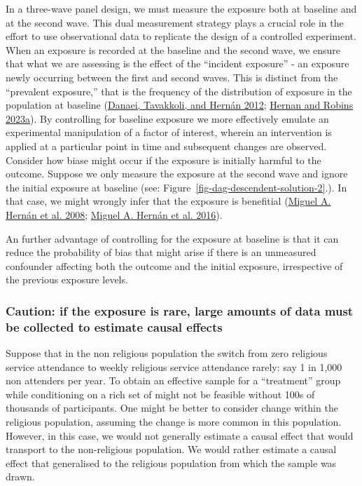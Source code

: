 \documentclass[
  singlecolumn]{report}
\begin{document}
In a three-wave panel design, we must measure the exposure both at
baseline and at the second wave. This dual measurement strategy plays a
crucial role in the effort to use observational data to replicate the
design of a controlled experiment. When an exposure is recorded at the
baseline and the second wave, we ensure that what we are assessing is
the effect of the ``incident exposure'' - an exposure newly occurring
between the first and second waves. This is distinct from the
``prevalent exposure,'' that is the frequency of the distribution of
exposure in the population at baseline
(\protect\hyperlink{ref-danaei2012}{Danaei, Tavakkoli, and Hernán 2012};
\protect\hyperlink{ref-hernan2023}{Hernan and Robins 2023a}). By
controlling for baseline exposure we more effectively emulate an
experimental manipulation of a factor of interest, wherein an
intervention is applied at a particular point in time and subsequent
changes are observed. Consider how biase might occur if the exposure is
initially harmful to the outcome. Suppose we only measure the exposure
at the second wave and ignore the initial exposure at baseline (see:
Figure~\ref{fig-dag-descendent-solution-2}.). In that case, we might
wrongly infer that the exposure is benefitial
(\protect\hyperlink{ref-hernuxe1n2008a}{Miguel A. Hernán et al. 2008};
\protect\hyperlink{ref-hernuxe1n2016a}{Miguel A. Hernán et al. 2016}).

An further advantage of controlling for the exposure at baseline is that
it can reduce the probability of bias that might arise if there is an
unmeasured confounder affecting both the outcome and the initial
exposure, irrespective of the previous exposure levels.

\hypertarget{caution-if-the-exposure-is-rare-large-amounts-of-data-must-be-collected-to-estimate-causal-effects}{%
\subsubsection{\texorpdfstring{\textbf{Caution: if the exposure is rare,
large amounts of data must be collected to estimate causal
effects}}{Caution: if the exposure is rare, large amounts of data must be collected to estimate causal effects}}\label{caution-if-the-exposure-is-rare-large-amounts-of-data-must-be-collected-to-estimate-causal-effects}}

Suppose that in the non religious population the switch from zero
religious service attendance to weekly religious service attendance
rarely: say 1 in 1,000 non attenders per year. To obtain an effective
sample for a ``treatment'' group while conditioning on a rich set of
might not be feasible without 100s of thousands of participants. One
might be better to consider change within the religious population,
assuming the change is more common in this population. However, in this
case, we would not generally estimate a causal effect that would
transport to the non-religious population. We would rather estimate a
causal effect that generalised to the religious population from which
the sample was drawn.
\end{document}
